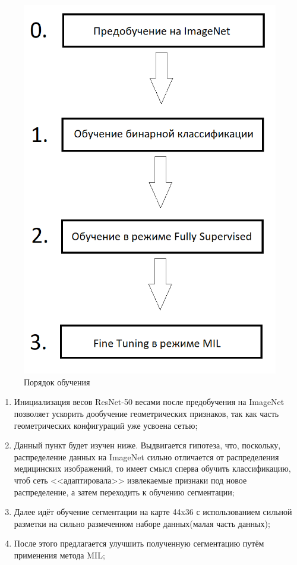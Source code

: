 \begin{figure}[h] 
  \center
  \includegraphics [scale=0.6] {images/schema.png}
  \caption{Порядок обучения} 
  \label{fig:schema_order}  
\end{figure}


\begin{enumerate}[start=0]
    \item Инициализация весов ResNet-50 весами после предобучения на ImageNet позволяет ускорить дообучение геометрических признаков, так как часть геометрических конфигураций уже усвоена сетью;
    \item Данный пункт будет изучен ниже. Выдвигается гипотеза, что, поскольку, распределение данных на ImageNet сильно отличается от распределения медицинских изображений, то имеет смысл сперва обучить классификацию, чтоб сеть <<адаптировала>> извлекаемые признаки под новое распределение, а затем переходить к обучению сегментации;  
    \item Далее идёт обучение сегментации на карте 44x36 с использованием сильной разметки на сильно размеченном наборе данных(малая часть данных);
    \item После этого предлагается улучшить полученную сегментацию путём применения метода MIL;
\end{enumerate}

